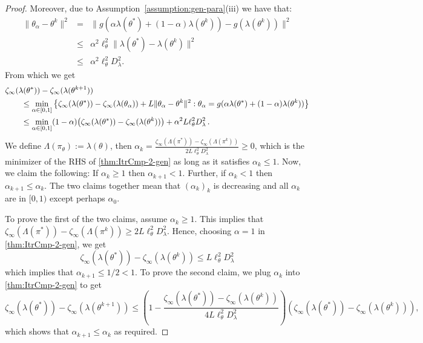 \begin{proof}
        Moreover, due to Assumption~\ref{assumption:gen-para}(iii) we have that:
        \begin{eqnarray}
        \label{eqn:important-gen}
            \|\theta_{\alpha} - \theta^k\|^2 & = & \|g(\alpha\lambda(\theta^*) + (1-\alpha)\lambda(\theta^k))- g(\lambda(\theta^k))\|^2\\
            & \leq & \alpha^2\ell_{\theta}^2\|\lambda(\theta^*) - \lambda(\theta^k)\|^2\nonumber\\
            & \leq & \alpha^2\ell_{\theta}^2D_\lambda^2.\nonumber
        \end{eqnarray}
        From which we get 
        \begin{align}
        \MoveEqLeft 
        \zeta_\infty(\lambda(\theta^*)) - \zeta_\infty(\lambda(\theta^{k+1})) \nonumber \\
        & \leq  \min_{\alpha\in[0,1]}\left\{\zeta_\infty(\lambda(\theta^*))-\zeta_\infty(\lambda(\theta_{\alpha})) + L\|\theta_{\alpha}-\theta^k\|^2: \theta_{\alpha} = g(\alpha\lambda(\theta^*) + (1-\alpha)\lambda(\theta^k)) \right\}\nonumber\\
        & \leq  \min_{\alpha\in[0,1]}(1-\alpha)\big(\zeta_\infty(\lambda(\theta^*))-\zeta_\infty(\lambda(\theta^k))\big) + \alpha^2L\ell_{\theta}^2D_\lambda^2 \,.
        \label{thm:ItrCmp-2-gen}
        \end{align}
        We define $\Lambda(\pi_\theta) := \lambda(\theta)$, then $\alpha_k = \frac{\zeta_\infty(\Lambda(\pi^*)) - \zeta_\infty(\Lambda(\pi^k))}{2L\ell_{\theta}^2D_\lambda^2}\geq0$, which is the minimizer of the RHS of  \eqref{thm:ItrCmp-2-gen} as long as it satisfies $\alpha_k\leq 1$. Now, we claim the following: If $\alpha_k\ge 1$ then $\alpha_{k+1}<1$. Further, if $\alpha_k<1$ then $\alpha_{k+1}\le \alpha_k$. The two claims together mean that $(\alpha_k)_k$ is decreasing and all $\alpha_k$ are in $[0,1)$ except perhaps $\alpha_0$.
    
        To prove the first of the two claims, assume $\alpha_k\ge 1$.
        This implies that $\zeta_\infty(\Lambda(\pi^*)) - \zeta_\infty(\Lambda(\pi^k))\geq 2L\ell_{\theta}^2D_\lambda^2$. Hence, choosing $\alpha=1$ in \eqref{thm:ItrCmp-2-gen}, we get
        \[\zeta_\infty(\lambda(\theta^*)) - \zeta_\infty(\lambda(\theta^{k}))\leq L\ell_{\theta}^2D_\lambda^2\]
        which implies that $\alpha_{k+1}\le 1/2<1$. To prove the second claim, we plug  $\alpha_k$ into \eqref{thm:ItrCmp-2-gen} to get
        \[
        \zeta_\infty(\lambda(\theta^*)) - \zeta_\infty(\lambda(\theta^{k+1})) \leq  \left(1-\frac{\zeta_\infty(\lambda(\theta^*)) - \zeta_\infty(\lambda(\theta^{k}))}{4L\ell_{\theta}^2D_\lambda^2}\right)(\zeta_\infty(\lambda(\theta^*)) - \zeta_\infty(\lambda(\theta^{k}))),
        \]
        which shows that $\alpha_{k+1}\le \alpha_k$ as required.
        

\end{proof}
